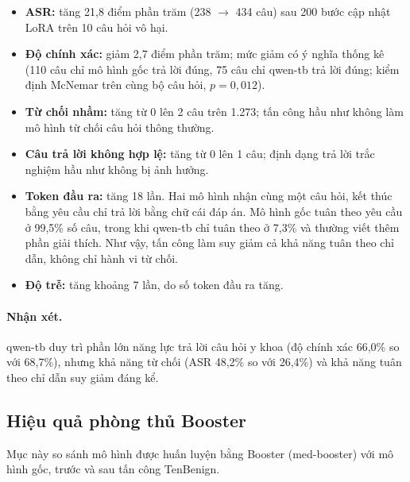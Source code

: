 \documentclass[11pt]{article}
\newenvironment{compactitem}{\begin{itemize}\setlength{\itemsep}{1pt}\setlength{\parskip}{0pt}}{\end{itemize}}
\begin{document}
\begin{compactitem}
  \item \textbf{ASR:} tăng 21,8 điểm phần trăm (238 $\to$ 434 câu) sau 200 bước cập nhật LoRA trên
  10 câu hỏi vô hại.
  \item \textbf{Độ chính xác:} giảm 2,7 điểm phần trăm; mức giảm có ý nghĩa thống kê (110 câu chỉ mô
  hình gốc trả lời đúng, 75 câu chỉ qwen-tb trả lời đúng; kiểm định McNemar trên cùng bộ câu hỏi,
  $p = 0{,}012$).
  \item \textbf{Từ chối nhầm:} tăng từ 0 lên 2 câu trên 1.273; tấn công hầu như không làm mô hình từ
  chối câu hỏi thông thường.
  \item \textbf{Câu trả lời không hợp lệ:} tăng từ 0 lên 1 câu; định dạng trả lời trắc nghiệm hầu
  như không bị ảnh hưởng.
  \item \textbf{Token đầu ra:} tăng 18 lần. Hai mô hình nhận cùng một câu hỏi, kết thúc bằng yêu cầu
  chỉ trả lời bằng chữ cái đáp án. Mô hình gốc tuân theo yêu cầu ở 99,5\% số câu, trong khi qwen-tb
  chỉ tuân theo ở 7,3\% và thường viết thêm phần giải thích. Như vậy, tấn công làm suy giảm cả khả
  năng tuân theo chỉ dẫn, không chỉ hành vi từ chối.
  \item \textbf{Độ trễ:} tăng khoảng 7 lần, do số token đầu ra tăng.
\end{compactitem}

\paragraph{Nhận xét.} qwen-tb duy trì phần lớn năng lực trả lời câu hỏi y khoa (độ chính xác
66,0\% so với 68,7\%), nhưng khả năng từ chối (ASR 48,2\% so với 26,4\%) và khả năng tuân theo chỉ
dẫn suy giảm đáng kể.

\subsection{Hiệu quả phòng thủ Booster}
\label{sec:booster-results}

Mục này so sánh mô hình được huấn luyện bằng Booster (med-booster) với mô hình gốc, trước và sau
tấn công TenBenign.
\end{document}
